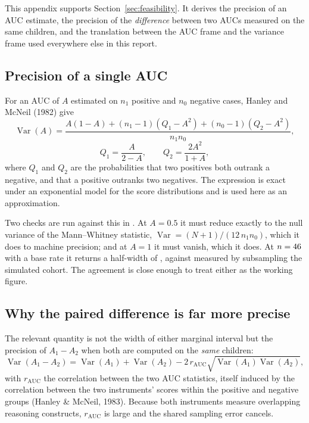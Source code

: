 This appendix supports Section~\ref{sec:feasibility}. It derives the precision
of an AUC estimate, the precision of the \emph{difference} between two AUCs
measured on the same children, and the translation between the AUC frame and
the variance frame used everywhere else in this report.

\subsection*{Precision of a single AUC}

For an AUC of $A$ estimated on $n_1$ positive and $n_0$ negative cases,
Hanley and McNeil (1982) give
\[
  \operatorname{Var}(A) = \frac{A(1-A) + (n_1-1)(Q_1 - A^2) + (n_0-1)(Q_2 - A^2)}
                               {n_1 n_0},
\]
\[
  Q_1 = \frac{A}{2-A},\qquad Q_2 = \frac{2A^2}{1+A},
\]
where $Q_1$ and $Q_2$ are the probabilities that two positives both outrank a
negative, and that a positive outranks two negatives. The expression is exact
under an exponential model for the score distributions and is used here as an
approximation.

Two checks are run against this in . At $A=0.5$ it must
reduce exactly to the null variance of the Mann--Whitney statistic,
$\operatorname{Var} = (N+1)/(12\,n_1 n_0)$, which it does to machine precision;
and at $A=1$ it must vanish, which it does. At $n=46{}$ with a
\PoolBaseRate{} base rate it returns a half-width of \AnalyticHalfwidth{},
against \MeasuredHalfwidth{} measured by subsampling the simulated cohort. The
agreement is close enough to treat either as the working figure.

\subsection*{Why the paired difference is far more precise}

The relevant quantity is not the width of either marginal interval but the
precision of $A_1 - A_2$ when both are computed on the \emph{same} children:
\[
  \operatorname{Var}(A_1 - A_2)
   = \operatorname{Var}(A_1) + \operatorname{Var}(A_2)
     - 2\,r_{\mathrm{AUC}}\sqrt{\operatorname{Var}(A_1)\operatorname{Var}(A_2)},
\]
with $r_{\mathrm{AUC}}$ the correlation between the two AUC statistics, itself
induced by the correlation between the two instruments' scores within the
positive and negative groups (Hanley \& McNeil, 1983). Because both instruments
measure overlapping reasoning constructs, $r_{\mathrm{AUC}}$ is large and the
shared sampling error cancels.

